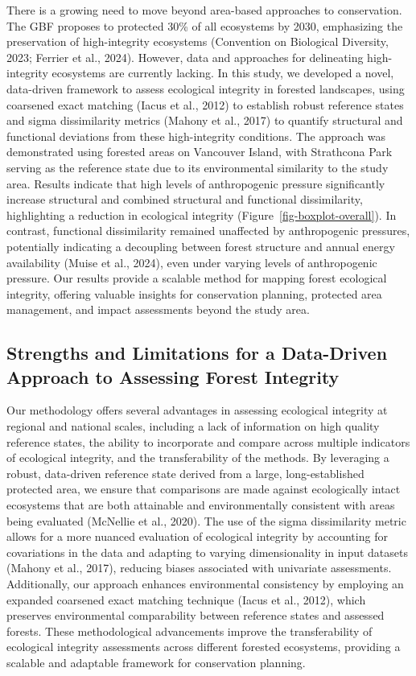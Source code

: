 \documentclass[
]{agujournal2019}
\begin{document}
There is a growing need to move beyond area-based approaches to
conservation. The GBF proposes to protected 30\% of all ecosystems by
2030, emphasizing the preservation of high-integrity ecosystems
(Convention on Biological Diversity, 2023; Ferrier et al., 2024).
However, data and approaches for delineating high-integrity ecosystems
are currently lacking. In this study, we developed a novel, data-driven
framework to assess ecological integrity in forested landscapes, using
coarsened exact matching (Iacus et al., 2012) to establish robust
reference states and sigma dissimilarity metrics (Mahony et al., 2017)
to quantify structural and functional deviations from these
high-integrity conditions. The approach was demonstrated using forested
areas on Vancouver Island, with Strathcona Park serving as the reference
state due to its environmental similarity to the study area. Results
indicate that high levels of anthropogenic pressure significantly
increase structural and combined structural and functional
dissimilarity, highlighting a reduction in ecological integrity
(Figure~\ref{fig-boxplot-overall}). In contrast, functional
dissimilarity remained unaffected by anthropogenic pressures,
potentially indicating a decoupling between forest structure and annual
energy availability (Muise et al., 2024), even under varying levels of
anthropogenic pressure. Our results provide a scalable method for
mapping forest ecological integrity, offering valuable insights for
conservation planning, protected area management, and impact assessments
beyond the study area.

\subsection{Strengths and Limitations for a Data-Driven Approach to
Assessing Forest
Integrity}\label{strengths-and-limitations-for-a-data-driven-approach-to-assessing-forest-integrity}

Our methodology offers several advantages in assessing ecological
integrity at regional and national scales, including a lack of
information on high quality reference states, the ability to incorporate
and compare across multiple indicators of ecological integrity, and the
transferability of the methods. By leveraging a robust, data-driven
reference state derived from a large, long-established protected area,
we ensure that comparisons are made against ecologically intact
ecosystems that are both attainable and environmentally consistent with
areas being evaluated (McNellie et al., 2020). The use of the sigma
dissimilarity metric allows for a more nuanced evaluation of ecological
integrity by accounting for covariations in the data and adapting to
varying dimensionality in input datasets (Mahony et al., 2017), reducing
biases associated with univariate assessments. Additionally, our
approach enhances environmental consistency by employing an expanded
coarsened exact matching technique (Iacus et al., 2012), which preserves
environmental comparability between reference states and assessed
forests. These methodological advancements improve the transferability
of ecological integrity assessments across different forested
ecosystems, providing a scalable and adaptable framework for
conservation planning.
\end{document}

